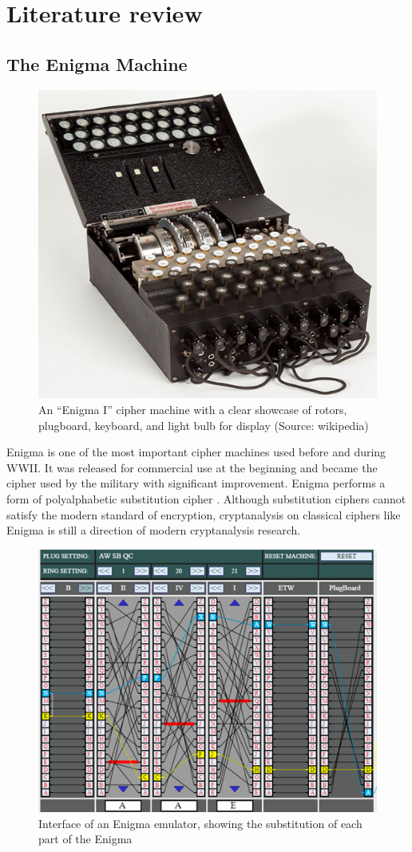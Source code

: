 \chapter{Literature review}
\section{The Enigma Machine}
\begin{figure}[hbt!]
    \centering
    \includegraphics[width=0.6\linewidth]{myReport//figures/Enigma_icon.png}
    \caption{An “Enigma I” cipher machine with a clear showcase of rotors, plugboard, keyboard, and light bulb for display (Source: wikipedia)}
    \label{fig:enter-label}
\end{figure}

Enigma is one of the most important cipher machines used before and during WWII. It was released for commercial use at the beginning and became the cipher used by the military with significant improvement. Enigma performs a form of polyalphabetic substitution cipher \cite{greydanus2017learning}. Although substitution ciphers cannot satisfy the modern standard of encryption, cryptanalysis on classical ciphers like Enigma is still a direction of modern cryptanalysis research. 

\begin{figure}[hbt!]
    \centering
    \includegraphics[width=0.6\linewidth]{figures/Enigma_emulator.png}
    \caption{Interface of an Enigma emulator, showing the substitution of each part of the Enigma}
    \label{fig:graph}
\end{figure}

